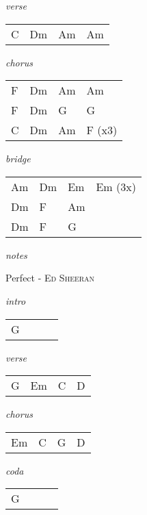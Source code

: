 \documentclass[12pt]{article}
\begin{document}
\textit{verse}

\begin{tabular}{|P{1.25in}|P{1.25in}|P{1.25in}|P{1.25in}|}
  C & Dm  & Am  & Am  \\
\end{tabular}

\textit{chorus}

\begin{tabular}{|P{1.25in}|P{1.25in}|P{1.25in}|P{1.25in}|}
  F & Dm  & Am  & Am  \\
  F & Dm  & G  & G  \\
  C & Dm & Am & F (x3) \\
\end{tabular}

\textit{bridge}

\begin{tabular}{|P{1.25in}|P{1.25in}|P{1.25in}|P{1.25in}|}
  Am & Dm  &  Em & Em (3x) \\
  Dm &  F   &  Am &   \\
  Dm &  F   &  G  &  \\
\end{tabular}

\textit{notes}

\newpage

{\Huge Perfect} {\huge - \textsc{Ed Sheeran}}

\huge
\textit{intro}

\begin{tabular}{|P{1.25in}|P{1.25in}|P{1.25in}|P{1.25in}|}
  G &   &   &   \\
\end{tabular}

\textit{verse}

\begin{tabular}{|P{1.25in}|P{1.25in}|P{1.25in}|P{1.25in}|}
  G &  Em & C  & D  \\
\end{tabular}

\textit{chorus}

\begin{tabular}{|P{1.25in}|P{1.25in}|P{1.25in}|P{1.25in}|}
  Em &  C &  G &  D \\
\end{tabular}

\textit{coda}

\begin{tabular}{|P{1.25in}|P{1.25in}|P{1.25in}|P{1.25in}|}
  G &   &   &   \\
\end{tabular}
\end{document}
